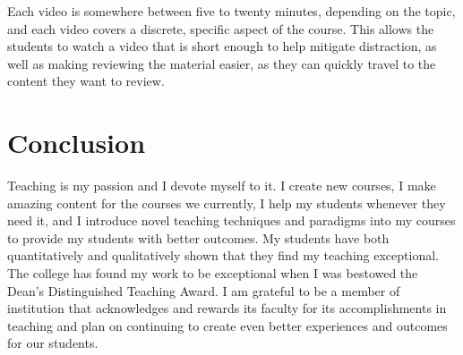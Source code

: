 \documentclass[10pt]{article}
\begin{document}
Each video is somewhere between five to twenty minutes, depending on the topic, and each video covers a discrete, specific aspect of the course.
This allows the students to watch a video that is short enough to help mitigate distraction, as well as making reviewing the material easier, as they can quickly travel to the content they want to review.

%


%
\section{Conclusion}
Teaching is my passion and I devote myself to it.
I create new courses, I make amazing content for the courses we currently, I help my students whenever they need it, and I introduce novel teaching techniques and paradigms into my courses to provide my students with better outcomes.
My students have both quantitatively and qualitatively shown that they find my teaching exceptional.
The college has found my work to be exceptional when I was bestowed the Dean's Distinguished Teaching Award.
I am grateful to be a member of institution that acknowledges and rewards its faculty for its accomplishments in teaching and plan on continuing to create even better experiences and outcomes for our students.
\end{document}

